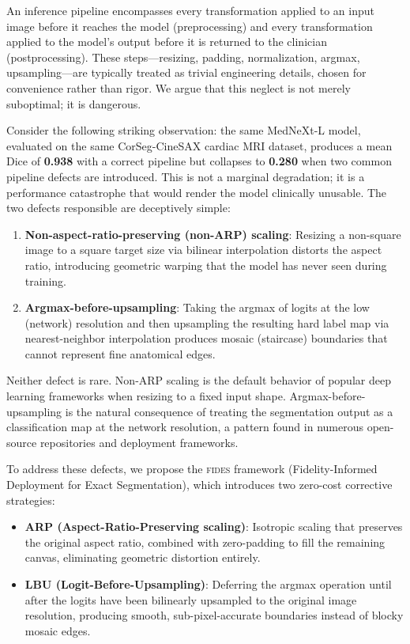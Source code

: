 \documentclass[10pt,twocolumn]{article}
\newcommand{\fides}{\textsc{fides}}
\begin{document}
An inference pipeline encompasses every transformation applied to an input image before it reaches the model (preprocessing) and every transformation applied to the model's output before it is returned to the clinician (postprocessing).
These steps---resizing, padding, normalization, argmax, upsampling---are typically treated as trivial engineering details, chosen for convenience rather than rigor.
We argue that this neglect is not merely suboptimal; it is dangerous.

Consider the following striking observation: the same MedNeXt-L model, evaluated on the same CorSeg-CineSAX cardiac MRI dataset, produces a mean Dice of \textbf{0.938} with a correct pipeline but collapses to \textbf{0.280} when two common pipeline defects are introduced.
This is not a marginal degradation; it is a performance catastrophe that would render the model clinically unusable.
The two defects responsible are deceptively simple:
\begin{enumerate}[leftmargin=*]
    \item \textbf{Non-aspect-ratio-preserving (non-ARP) scaling}: Resizing a non-square image to a square target size via bilinear interpolation distorts the aspect ratio, introducing geometric warping that the model has never seen during training.
    \item \textbf{Argmax-before-upsampling}: Taking the argmax of logits at the low (network) resolution and then upsampling the resulting hard label map via nearest-neighbor interpolation produces mosaic (staircase) boundaries that cannot represent fine anatomical edges.
\end{enumerate}
Neither defect is rare. Non-ARP scaling is the default behavior of popular deep learning frameworks when resizing to a fixed input shape. Argmax-before-upsampling is the natural consequence of treating the segmentation output as a classification map at the network resolution, a pattern found in numerous open-source repositories and deployment frameworks.

To address these defects, we propose the \fides{} framework (Fidelity-Informed Deployment for Exact Segmentation), which introduces two zero-cost corrective strategies:
\begin{itemize}[leftmargin=*]
    \item \textbf{ARP (Aspect-Ratio-Preserving scaling)}: Isotropic scaling that preserves the original aspect ratio, combined with zero-padding to fill the remaining canvas, eliminating geometric distortion entirely.
    \item \textbf{LBU (Logit-Before-Upsampling)}: Deferring the argmax operation until after the logits have been bilinearly upsampled to the original image resolution, producing smooth, sub-pixel-accurate boundaries instead of blocky mosaic edges.
\end{itemize}
\end{document}
